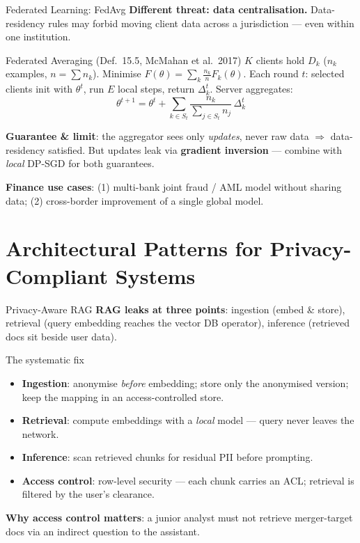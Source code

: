 \documentclass[9pt,t]{beamer}
\begin{document}
\begin{frame}{Federated Learning: FedAvg}
\textbf{Different threat: data centralisation.} Data-residency rules may forbid
moving client data across a jurisdiction --- even within one institution.

\medskip
\begin{block}{Federated Averaging (Def.\ 15.5, McMahan et al.\ 2017)}
$K$ clients hold $D_k$ ($n_k$ examples, $n=\sum n_k$). Minimise
$F(\theta)=\sum_k \frac{n_k}{n}F_k(\theta)$. Each round $t$: selected clients init
with $\theta^t$, run $E$ local steps, return $\Delta_k^t$. Server aggregates:
\[
\theta^{t+1} = \theta^t + \sum_{k \in S_t}\frac{n_k}{\sum_{j\in S_t} n_j}\,\Delta_k^t
\]
\end{block}

\medskip
\textbf{Guarantee \& limit}: the aggregator sees only \emph{updates}, never raw data
$\Rightarrow$ data-residency satisfied. But updates leak via \textbf{gradient
inversion} --- combine with \emph{local} DP-SGD for both guarantees.

\medskip
\textbf{Finance use cases}: (1) multi-bank joint fraud / AML model without sharing
data; (2) cross-border improvement of a single global model.
\end{frame}

\section{Architectural Patterns for Privacy-Compliant Systems}

\begin{frame}{Privacy-Aware RAG}
\textbf{RAG leaks at three points}: ingestion (embed \& store), retrieval (query
embedding reaches the vector DB operator), inference (retrieved docs sit beside user data).

\medskip
\begin{block}{The systematic fix}
\begin{itemize}
  \item \textbf{Ingestion}: anonymise \emph{before} embedding; store only the
        anonymised version; keep the mapping in an access-controlled store.
  \item \textbf{Retrieval}: compute embeddings with a \emph{local} model --- query
        never leaves the network.
  \item \textbf{Inference}: scan retrieved chunks for residual PII before prompting.
  \item \textbf{Access control}: row-level security --- each chunk carries an ACL;
        retrieval is filtered by the user's clearance.
\end{itemize}
\end{block}

\medskip
\textbf{Why access control matters}: a junior analyst must not retrieve merger-target
docs via an indirect question to the assistant.
\end{frame}
\end{document}
